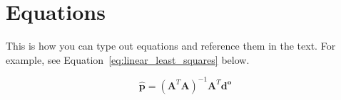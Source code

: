 \section{Equations}

This is how you can type out equations and reference them in the text. For
example, see Equation~\ref{eq:linear_least_squares} below.

\begin{equation}
  \mathbf{\hat{p}} =
    \left(\mathbf{A}^T\mathbf{A}\right)^{-1}
    \mathbf{A}^T\mathbf{d^o}
  \label{eq:linear_least_squares}
\end{equation}
